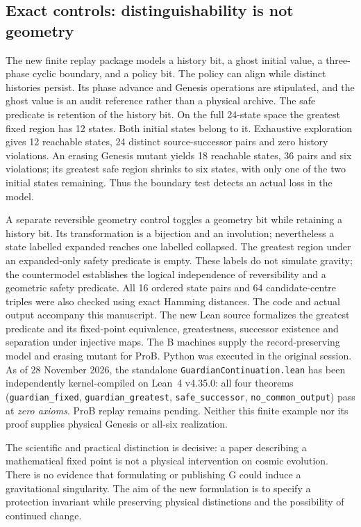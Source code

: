 \documentclass[11pt,a4paper]{article}
\begin{document}
\subsection{Exact controls: distinguishability is not geometry}
The new finite replay package models a history bit, a ghost initial value, a three-phase cyclic boundary, and a policy bit. The policy can align while distinct histories persist. Its phase advance and Genesis operations are stipulated, and the ghost value is an audit reference rather than a physical archive. The safe predicate is retention of the history bit. On the full 24-state space the greatest fixed region has 12 states. Both initial states belong to it. Exhaustive exploration gives 12 reachable states, 24 distinct source-successor pairs and zero history violations. An erasing Genesis mutant yields 18 reachable states, 36 pairs and six violations; its greatest safe region shrinks to six states, with only one of the two initial states remaining. Thus the boundary test detects an actual loss in the model.

A separate reversible geometry control toggles a geometry bit while retaining a history bit. Its transformation is a bijection and an involution; nevertheless a state labelled expanded reaches one labelled collapsed. The greatest region under an expanded-only safety predicate is empty. These labels do not simulate gravity; the countermodel establishes the logical independence of reversibility and a geometric safety predicate. All 16 ordered state pairs and 64 candidate-centre triples were also checked using exact Hamming distances. The code and actual output accompany this manuscript. The new Lean source formalizes the greatest predicate and its fixed-point equivalence, greatestness, successor existence and separation under injective maps. The B machines supply the record-preserving model and erasing mutant for ProB. Python was executed in the original session. As of 28 November 2026, the standalone \texttt{GuardianContinuation.lean} has been independently kernel-compiled on Lean~4 v4.35.0: all four theorems (\texttt{guardian\_fixed}, \texttt{guardian\_greatest}, \texttt{safe\_successor}, \texttt{no\_common\_output}) pass at \emph{zero axioms}. ProB replay remains pending. Neither this finite example nor its proof supplies physical Genesis or all-six realization.

The scientific and practical distinction is decisive: a paper describing a mathematical fixed point is not a physical intervention on cosmic evolution. There is no evidence that formulating or publishing G could induce a gravitational singularity. The aim of the new formulation is to specify a protection invariant while preserving physical distinctions and the possibility of continued change.
\end{document}
